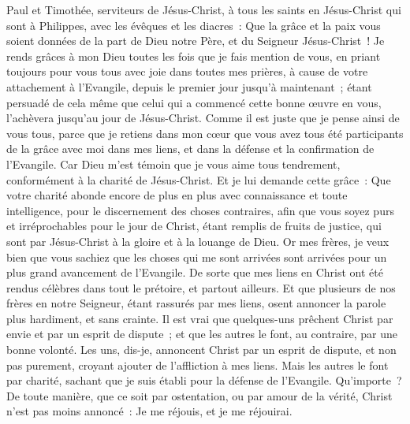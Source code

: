 \begin{multicols}{2}
\VerseOne{}Paul et Timothée, serviteurs de Jésus-Christ, à tous les saints en Jésus-Christ qui sont à Philippes, avec les évêques et les diacres~:
Que la grâce et la paix vous soient données de la part de Dieu notre Père, et du Seigneur Jésus-Christ~!
Je rends grâces à mon Dieu toutes les fois que je fais mention de vous,
en priant toujours pour vous tous avec joie dans toutes mes prières,
à cause de votre attachement à l'Evangile, depuis le premier jour jusqu'à maintenant~;
étant persuadé de cela même que celui qui a commencé cette bonne œuvre en vous, l'achèvera jusqu'au jour de Jésus-Christ.
Comme il est juste que je pense ainsi de vous tous, parce que je retiens dans mon cœur que vous avez tous été participants de la grâce avec moi dans mes liens, et dans la défense et la confirmation de l'Evangile.
Car Dieu m'est témoin que je vous aime tous tendrement, conformément à la charité de Jésus-Christ.
Et je lui demande cette grâce~: Que votre charité abonde encore de plus en plus avec connaissance et toute intelligence,
pour le discernement des choses contraires, afin que vous soyez purs et irréprochables pour le jour de Christ,
étant remplis de fruits de justice, qui sont par Jésus-Christ à la gloire et à la louange de Dieu.
Or mes frères, je veux bien que vous sachiez que les choses qui me sont arrivées sont arrivées pour un plus grand avancement de l'Evangile.
De sorte que mes liens en Christ ont été rendus célèbres dans tout le prétoire, et partout ailleurs. 
Et que plusieurs de nos frères en notre Seigneur, étant rassurés par mes liens, osent annoncer la parole plus hardiment, et sans crainte. 
Il est vrai que quelques-uns prêchent Christ par envie et par un esprit de dispute~; et que les autres le font, au contraire, par une bonne volonté. 
Les uns, dis-je, annoncent Christ par un esprit de dispute, et non pas purement, croyant ajouter de l'affliction à mes liens.
Mais les autres le font par charité, sachant que je suis établi pour la défense de l'Evangile.
Qu'importe~? De toute manière, que ce soit par ostentation, ou par amour de la vérité, Christ n'est pas moins annoncé~: Je me réjouis, et je me réjouirai.

\end{multicols}

